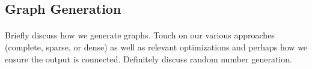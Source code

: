 \subsection{Graph Generation}
\label{sec:deep:graphgen}

\paragraph{}
Briefly discuss how we generate graphs. Touch on our various approaches
(complete, sparse, or dense) as well as relevant optimizations and perhaps how
we ensure the output is connected.  Definitely discuss random number generation.
